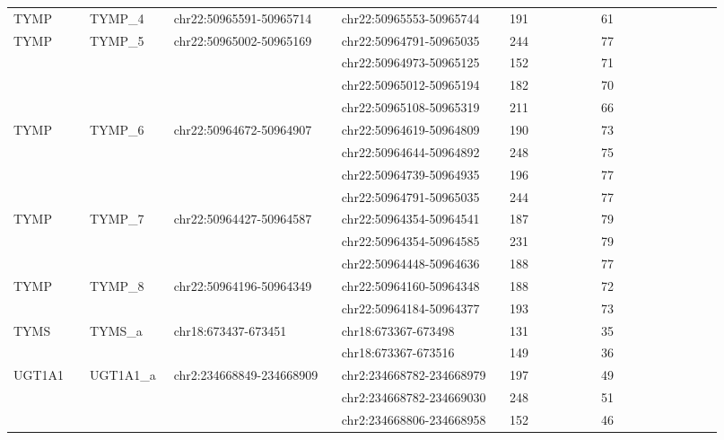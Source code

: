 \begin{landscape}
\begin{longtable}{p{0.1\linewidth}|p{0.1\linewidth}p{0.22\linewidth}p{0.22\linewidth}p{0.12\linewidth}p{0.16\linewidth}}
\\
TYMP & TYMP\_4 & chr22:50965591-50965714 & chr22:50965553-50965744 & 191 & 61
\\
TYMP & TYMP\_5 & chr22:50965002-50965169 & chr22:50964791-50965035 & 244 & 77
\\
 & & & chr22:50964973-50965125 & 152 & 71
\\
 & & & chr22:50965012-50965194 & 182 & 70
\\
 & & & chr22:50965108-50965319 & 211 & 66
\\
TYMP & TYMP\_6 & chr22:50964672-50964907 & chr22:50964619-50964809 & 190 & 73
\\
 & & & chr22:50964644-50964892 & 248 & 75
\\
 & & & chr22:50964739-50964935 & 196 & 77
\\
 & & & chr22:50964791-50965035 & 244 & 77
\\
TYMP & TYMP\_7 & chr22:50964427-50964587 & chr22:50964354-50964541 & 187 & 79
\\
 & & & chr22:50964354-50964585 & 231 & 79
\\
 & & & chr22:50964448-50964636 & 188 & 77
\\
TYMP & TYMP\_8 & chr22:50964196-50964349 & chr22:50964160-50964348 & 188 & 72
\\
 & & & chr22:50964184-50964377 & 193 & 73
\\
\hline
TYMS & TYMS\_a & chr18:673437-673451 & chr18:673367-673498 & 131 & 35
\\
 & & & chr18:673367-673516 & 149 & 36
\\
\hline
UGT1A1 & UGT1A1\_a & chr2:234668849-234668909 & chr2:234668782-234668979 & 197 & 49
\\
 & & & chr2:234668782-234669030 & 248 & 51
\\
 & & & chr2:234668806-234668958 & 152 & 46
\\
\hline

\end{longtable}
\end{landscape}
